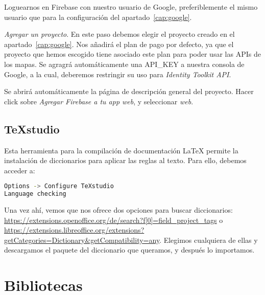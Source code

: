 \begin{steps}
	\item Loguearnos en Firebase con nuestro usuario de Google, preferiblemente el mismo usuario que para la configuración del apartado~\ref{cap:google}.
	\item \textit{Agregar un proyecto}. En este paso debemos elegir el proyecto creado en el apartado~\ref{cap:google}. Nos añadirá el plan de pago por defecto, ya que el proyecto que hemos escogido tiene asociado este plan para poder usar las APIs de los mapas. Se agragrá automáticamente una API\_KEY a nuestra consola de Google, a la cual, deberemos restringir su uso para \textit{Identity Toolkit API}.
	\item Se abrirá automáticamente la página de descripción general del proyecto. Hacer click sobre \textit{Agregar Firebase a tu app web}, y seleccionar \textit{web}.
\end{steps}


  
\subsection{\TeX studio}
Esta herramienta para la compilación de documentación \LaTeX{} permite la instalación de diccionarios para aplicar las reglas al texto. Para ello, debemos acceder a:

\renewcommand{\lstlistingname}{Configure \TeX studio}%
\renewcommand{\lstlistlistingname}{List of \lstlistingname s}
\begin{lstlisting}[language=bash,caption={Añadir diccionario}]
Options -> Configure TeXstudio
Language checking
\end{lstlisting}

Una vez ahí, vemos que nos ofrece dos opciones para buscar diccionarios: \url{https://extensions.openoffice.org/de/search?f[0]=field_project_tags} o \url{https://extensions.libreoffice.org/extensions?getCategories=Dictionary&getCompatibility=any}. Elegimos cualquiera de ellas y descargamos el paquete del diccionario que queramos, y después lo importamos.


\section{Bibliotecas}


